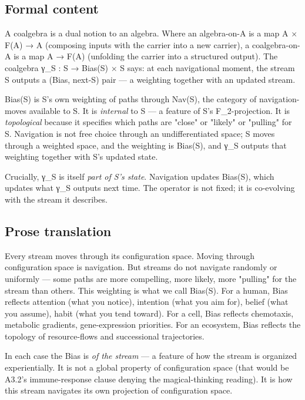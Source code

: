 \documentclass[11pt, openany]{book}
\begin{document}
\subsection{Formal content}

A coalgebra is a dual notion to an algebra. Where an algebra-on-A is a map A × F(A) → A (composing inputs with the carrier into a new carrier), a coalgebra-on-A is a map A → F(A) (unfolding the carrier into a structured output). The coalgebra γ\_\allowbreak{}S : S → Bias(S) × S says: at each navigational moment, the stream S outputs a (Bias, next-S) pair --- a weighting together with an updated stream.

Bias(S) is S's own weighting of paths through Nav(S), the category of navigation-moves available to S. It is \textit{internal} to S --- a feature of S's F\_\allowbreak{}2-projection. It is \textit{topological} because it specifies which paths are "close" or "likely" or "pulling" for S. Navigation is not free choice through an undifferentiated space; S moves through a weighted space, and the weighting is Bias(S), and γ\_\allowbreak{}S outputs that weighting together with S's updated state.

Crucially, γ\_\allowbreak{}S is itself \textit{part of S's state}. Navigation updates Bias(S), which updates what γ\_\allowbreak{}S outputs next time. The operator is not fixed; it is co-evolving with the stream it describes.

\subsection{Prose translation}

Every stream moves through its configuration space. Moving through configuration space is navigation. But streams do not navigate randomly or uniformly --- some paths are more compelling, more likely, more "pulling" for the stream than others. This weighting is what we call Bias(S). For a human, Bias reflects attention (what you notice), intention (what you aim for), belief (what you assume), habit (what you tend toward). For a cell, Bias reflects chemotaxis, metabolic gradients, gene-expression priorities. For an ecosystem, Bias reflects the topology of resource-flows and successional trajectories.

In each case the Bias is \textit{of the stream} --- a feature of how the stream is organized experientially. It is not a global property of configuration space (that would be A3.2's immune-response clause denying the magical-thinking reading). It is how this stream navigates its own projection of configuration space.
\end{document}
